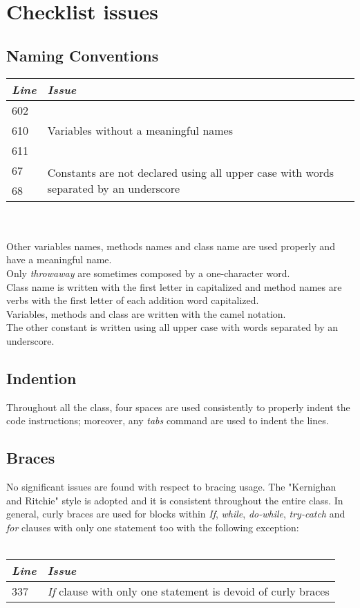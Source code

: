 \documentclass[11pt,a4paper]{report}
\begin{document}
\section{Checklist issues}
\subsection{Naming Conventions}
\begin{tabularx}{\textwidth}{|l|X|}
	\hline
	\textit{Line} & \textit{Issue}\\
	\hline
	602 & \multirow{3}{*}{Variables without a meaningful names}\\
	610 & \\
	611 & \\
	\hline
	\hline
	67 & \multirow{2}{\linewidth}{{Constants are not declared using all upper case with words separated by an underscore}}\\
	68 & \\
	\hline
\end{tabularx}
\\\\
Other variables names, methods names and class name are used properly and have a meaningful name.\\Only \textit{throwaway} are sometimes composed by a one-character word.\\Class name is written with the first letter in capitalized and method names are verbs with the first letter of each addition word capitalized.\\Variables, methods and class are written with the camel notation.\\The other constant is written using all upper case with words separated by an underscore.
\subsection{Indention}
Throughout all the class, four spaces are used consistently to properly indent the code instructions; moreover, any \textit{tabs} command are used to indent the	 lines.
\subsection{Braces}
No significant issues are found with respect to bracing usage. The "Kernighan and Ritchie" style is adopted and it is consistent throughout the entire class. In general, curly braces are used for blocks within \textit{If}, \textit{while}, \textit{do-while}, \textit{try-catch} and \textit{for} clauses with only one statement too with the following exception:
\\\\
\begin{tabularx}{\textwidth}{|l|X|}
	\hline
	\textit{Line} & \textit{Issue}\\
	\hline
	337 & \multirow{1}{*}{\textit{If} clause with only one statement is devoid of curly braces}\\
	\hline
\end{tabularx}
\end{document}
